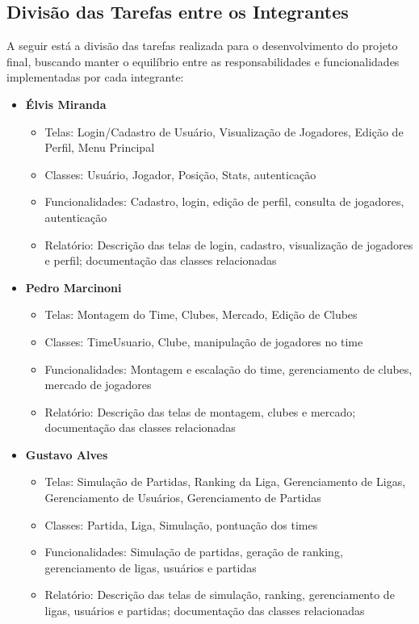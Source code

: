 \documentclass[12pt]{article}
\begin{document}
\subsection{Divisão das Tarefas entre os Integrantes}
\label{sec:divisao_tarefas}

A seguir está a divisão das tarefas realizada para o desenvolvimento do projeto final, buscando manter o equilíbrio entre as responsabilidades e funcionalidades implementadas por cada integrante:

\begin{itemize}
  \item \textbf{Élvis Miranda}
        \begin{itemize}
          \item Telas: Login/Cadastro de Usuário, Visualização de Jogadores, Edição de Perfil, Menu Principal
          \item Classes: Usuário, Jogador, Posição, Stats, autenticação
          \item Funcionalidades: Cadastro, login, edição de perfil, consulta de jogadores, autenticação
          \item Relatório: Descrição das telas de login, cadastro, visualização de jogadores e perfil; documentação das classes relacionadas
        \end{itemize}
  \item \textbf{Pedro Marcinoni}
        \begin{itemize}
          \item Telas: Montagem do Time, Clubes, Mercado, Edição de Clubes
          \item Classes: TimeUsuario, Clube, manipulação de jogadores no time
          \item Funcionalidades: Montagem e escalação do time, gerenciamento de clubes, mercado de jogadores
          \item Relatório: Descrição das telas de montagem, clubes e mercado; documentação das classes relacionadas
        \end{itemize}
  \item \textbf{Gustavo Alves}
        \begin{itemize}
          \item Telas: Simulação de Partidas, Ranking da Liga, Gerenciamento de Ligas, Gerenciamento de Usuários, Gerenciamento de Partidas
          \item Classes: Partida, Liga, Simulação, pontuação dos times
          \item Funcionalidades: Simulação de partidas, geração de ranking, gerenciamento de ligas, usuários e partidas
          \item Relatório: Descrição das telas de simulação, ranking, gerenciamento de ligas, usuários e partidas; documentação das classes relacionadas
        \end{itemize}
\end{itemize}
\end{document}
